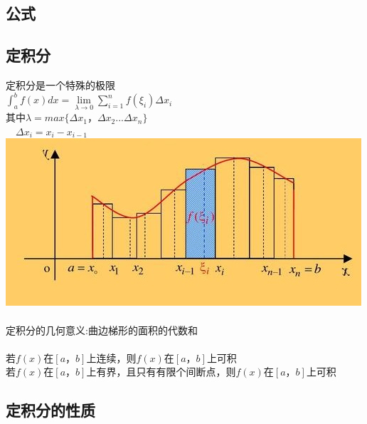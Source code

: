 \documentclass{article}
\begin{document}
\begin{flushleft}
	\LARGE
	
	\section{公式}
	
	\subsection{定积分}
	
	定积分是一个特殊的极限\\
	$\int_{a}^{b}f(x)dx=\lim\limits_{\lambda\to 0}\sum_{i=1}^{n}f(\xi_i)\Delta x_i$\\
	其中$\lambda = max\{\Delta x_1， \Delta x_2...\Delta x_n\}$\\
	\ \ $\Delta x_i=x_i-x_{i-1}$\\
	\includegraphics[scale=1.0]{2.jpg}\\
	~\\
	定积分的几何意义:曲边梯形的面积的代数和\\
	~\\
	若$f(x)$在$[a，b]$上连续，则$f(x)$在$[a，b]$上可积\\
	若$f(x)$在$[a，b]$上有界，且只有有限个间断点，则$f(x)$在$[a，b]$上可积\\
	
	\subsection{定积分的性质}
	

\end{flushleft}
\end{document}
